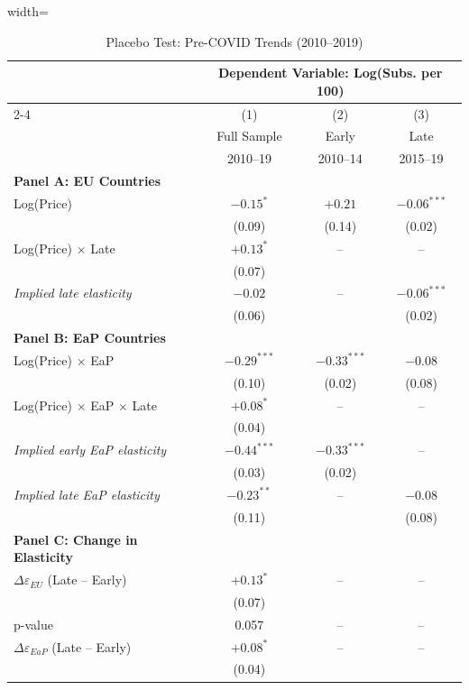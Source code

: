 \begin{table}[!htbp]
\centering
\caption{Placebo Test: Pre-COVID Trends (2010--2019)}
\label{tab:placebo}
\begin{minipage}{\textwidth}
\begin{adjustbox}{width=\textwidth}
\tiny
\setlength{\tabcolsep}{3pt}
\renewcommand{\arraystretch}{0.8}
\begin{tabular}{@{}lccc@{}}
\toprule
& \multicolumn{3}{c}{Dependent Variable: Log(Subs. per 100)} \\
\cmidrule(lr){2-4}
& (1) & (2) & (3) \\
& Full Sample & Early & Late \\
& 2010--19 & 2010--14 & 2015--19 \\
\midrule
\textbf{Panel A: EU Countries} \\
Log(Price) & $-0.15^{*}$ & $+0.21$ & $-0.06^{***}$ \\
& (0.09) & (0.14) & (0.02) \\
Log(Price) $\times$ Late & $+0.13^{*}$ & -- & -- \\
& (0.07) & & \\
\textit{Implied late elasticity} & $-0.02$ & -- & $-0.06^{***}$ \\
& (0.06) & & (0.02) \\
\midrule
\textbf{Panel B: EaP Countries} \\
Log(Price) $\times$ EaP & $-0.29^{***}$ & $-0.33^{***}$ & $-0.08$ \\
& (0.10) & (0.02) & (0.08) \\
Log(Price) $\times$ EaP $\times$ Late & $+0.08^{*}$ & -- & -- \\
& (0.04) & & \\
\textit{Implied early EaP elasticity} & $-0.44^{***}$ & $-0.33^{***}$ & -- \\
& (0.03) & (0.02) & \\
\textit{Implied late EaP elasticity} & $-0.23^{**}$ & -- & $-0.08$ \\
& (0.11) & & (0.08) \\
\midrule
\textbf{Panel C: Change in Elasticity} \\
$\Delta\varepsilon_{EU}$ (Late -- Early) & $+0.13^{*}$ & -- & -- \\
& (0.07) & & \\
p-value & 0.057 & -- & -- \\
$\Delta\varepsilon_{EaP}$ (Late -- Early) & $+0.08^{*}$ & -- & -- \\
& (0.04) & & \\

\end{tabular}
\end{adjustbox}
\end{minipage}
\end{table}
